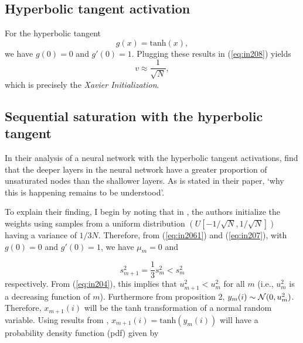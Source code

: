 \documentclass[a4paper]{article}
\newcommand{\enum}[1]{\label{eq:#1}}
\newcommand{\eref}[1]{(\ref {eq:#1})}
\newcommand{\be}{\begin{equation}}
\newcommand{\ee}{\end{equation}}
\begin{document}
\subsection{Hyperbolic tangent activation}
For the hyperbolic tangent 
\be 
g(x) =\mbox{tanh}(x),
\ee
we have $g(0) = 0$ and $g'(0) = 1$. Plugging these results in \eref{in208} yields
\be 
v \approx \frac{1}{\sqrt{N}}, \enum{tanh1}
\ee 
which is precisely the {\it{Xavier Initialization}}.


\subsection*{Sequential saturation with the hyperbolic tangent}


In their analysis of a neural network with the hyperbolic tangent activations, \cite{glorot2010understanding}  find that the deeper layers in the neural network have a greater proportion of unsaturated nodes than the shallower layers. As is stated in their paper, `why this is happening remains to be understood'.

To explain their finding, I begin by noting that in  \cite{glorot2010understanding}, the authors initialize the weights using samples from a uniform distribution $\left(U[-1/\sqrt{N},1/\sqrt{N}]\right)$ having a variance of  $1/3N$. Therefore, from \eref{in2061} and \eref{in207}, with $g(0) = 0$ and $g'(0) = 1$, we have $\mu_{m} = 0$ and



\be 
s_{m+1}^{2} = \frac{1}{3}s_{m}^{2} < s_{m}^{2}
\ee \enum{seq1}
respectively. From \eref{in204}, this implies that $u_{m+1}^{2}<u_{m}^{2}$ for all $m$ (i.e., $u_{m}^{2}$ is a decreasing function of $m$).  Furthermore from proposition 2, $y_{m}(i) \sim {\cal{N}}(0,u_{m}^{2})$. Therefore, $x_{m+1}(i)$ will be the tanh transformation of a normal random variable. Using results from \cite{godfrey2009tanh}, $x_{m+1}(i) = \mbox{tanh}(y_{m}(i))$ will have a probability density function (pdf) given by 
 
\end{document}
